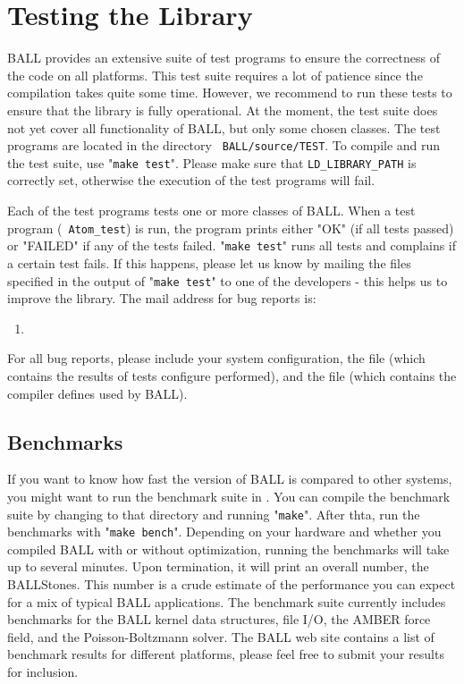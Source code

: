 \section{Testing the Library}

BALL provides an extensive suite of test programs to ensure the correctness of
the code on all platforms. This test suite requires a lot of patience since
the compilation takes quite some time. However, we recommend to run these
tests to ensure that the library is fully operational. At the moment, the test
suite does not yet cover all functionality of BALL, but only some chosen
classes.  The test programs are located in the directory {\tt
BALL/source/TEST}.  To compile and run the test suite, use "{\tt make test}".
Please make sure that {\tt LD\_LIBRARY\_PATH} is correctly set, otherwise the
execution of the test programs will fail.

Each of the test programs tests one or more classes of BALL. When a test
program (\eg~{\tt Atom\_test}) is run, the program prints either "OK" (if all
tests passed) or "FAILED" if any of the tests failed. "{\tt make test}" runs
all tests and complains if a certain test fails.  If this happens, please let
us know by mailing the files specified in the output of "{\tt make test}" to
one of the developers - this helps us to improve the library.  The mail
address for bug reports is:
\begin{enumerate}
	\item[] 
\end{enumerate}

\noindent
For all bug reports, please include your system configuration, the file
 (which contains the results of tests configure performed),
and the file  (which contains the compiler
defines used by BALL).

\subsection{Benchmarks}

If you want to know how fast the version of BALL is compared to other systems,
you might want to run the benchmark suite in .
You can compile the benchmark suite by changing to that directory and running
"{\tt make}". After thta, run the benchmarks with "{\tt make bench}".
Depending on your hardware and whether you compiled BALL with or without
optimization, running the benchmarks will take up to several minutes. Upon
termination, it will print an overall number, the BALLStones. This number is a
crude estimate of the performance you can expect for a mix of typical BALL
applications. The benchmark suite currently includes benchmarks for the BALL
kernel data structures, file I/O, the AMBER force field, and the
Poisson-Boltzmann solver. The BALL web site contains a list of benchmark
results for different platforms, please feel free to submit your results for
inclusion.
